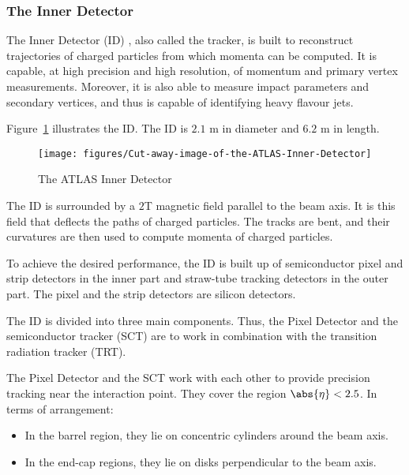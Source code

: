 \subsubsection{The Inner Detector}\label{s:decinner}

The Inner Detector (ID) \cite{lhcaccexp}, also called the tracker, is built to
reconstruct trajectories of charged particles from which momenta can be
computed. It is capable, at high precision and high resolution, of momentum and
primary vertex measurements. Moreover, it is also able to measure impact
parameters and secondary vertices, and thus is capable of identifying heavy
flavour jets.

Figure~\ref{f:innerd} illustrates the ID. The ID is $2.1$ m in diameter and
$6.2$ m in length.



\begin{figure}[H]
	\texttt{[image: figures/Cut-away-image-of-the-ATLAS-Inner-Detector]}
	\centering
	\caption{The ATLAS Inner Detector}
	\label{f:innerd}
\end{figure}


The ID is surrounded by a $2$T magnetic field parallel to the beam axis. It is
this field that deflects the paths of charged particles. The tracks are bent,
and their curvatures are then used to compute momenta of charged particles.

To achieve the desired performance, the ID is built up of semiconductor pixel
and strip detectors in the inner part and straw-tube tracking detectors in the
outer part. The pixel and the strip detectors are silicon detectors.

The ID is divided into three main components. Thus, the Pixel Detector and the
semiconductor tracker (SCT) are to work in combination with the transition
radiation tracker (TRT).

\vspace{5mm}

The Pixel Detector and the SCT work with each other to provide precision
tracking near the interaction point. They cover the region $\abs{\eta}<2.5$. In
terms of arrangement:

\begin{itemize}
	\item In the barrel region, they lie on concentric cylinders around the beam axis.
	\item In the end-cap regions, they lie on disks perpendicular to the beam axis.
\end{itemize}

